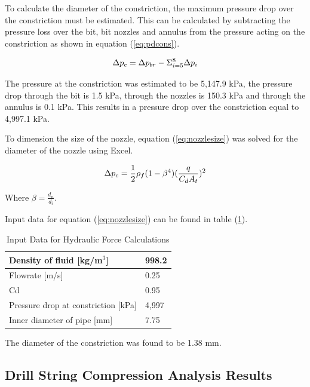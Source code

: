 To calculate the diameter of the constriction, the maximum pressure drop over the constriction must be estimated. This can be calculated by subtracting the pressure loss over the bit, bit nozzles and annulus from the pressure acting on the constriction as shown in equation (\ref{eq:pdcons}).


\begin{equation}
\centering
   \Delta p_{c}=\Delta p_{br} -\Sigma_{i=5}^{8} \Delta p_i
\label{eq:pdcons}
\end{equation}

The pressure at the constriction was estimated to be 5,147.9 kPa, the pressure drop through the bit is 1.5 kPa, through the nozzles is 150.3 kPa and through the annulus is 0.1 kPa. This results in a pressure drop over the constriction equal to 4,997.1 kPa.

To dimension the size of the nozzle, equation (\ref{eq:nozzlesize}) was solved for the diameter of the nozzle using Excel.

\begin{equation}
\centering
   \Delta p_{c}=\frac{1}{2} \rho_f (1-\beta^4)(\frac{q}{C_d A_t})^2
\label{eq:nozzlesize}
\end{equation}


Where $\beta = \frac{d_n}{d_i}$.


Input data for equation (\ref{eq:nozzlesize}) can be found in table (\ref{tab:inputdata}).

\begin{table} [H]
    \centering
    \caption{Input Data for Hydraulic Force Calculations}
    \begin{tabular}{p{7cm} p{2cm}}
        Density of fluid [kg/m$^3$] & 998.2 \\ \hline
        Flowrate [m/s] & 0.25 \\ \hline
        Cd & 0.95 \\ \hline
        Pressure drop at constriction [kPa] & 4,997 \\ \hline
        Inner diameter of pipe [mm] & 7.75 \\ 
    \end{tabular}
    \label{tab:inputdata}
\end{table}

The diameter of the constriction was found to be 1.38 mm.



\subsection{Drill String Compression Analysis Results} \caption{ssec:comp}

